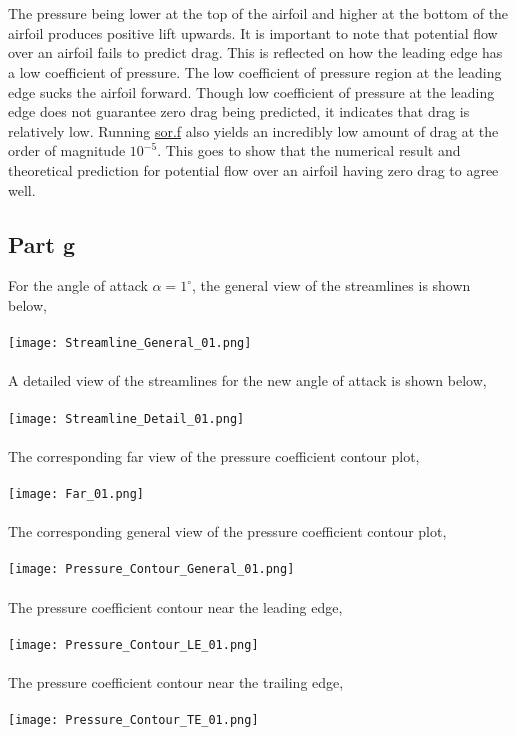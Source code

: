 \documentclass[a4paper, 12pt]{report}
\def\a{\alpha}
\def\sizel{1.03}
\begin{document}
\begin{center}
\\~\\The pressure being lower at the top of the airfoil and higher at the bottom of the airfoil produces positive lift upwards. It is important to note that potential flow over an airfoil fails to predict drag. This is reflected on how the leading edge has a low coefficient of pressure. The low coefficient of pressure region at the leading edge sucks the airfoil forward. Though low coefficient of pressure at the leading edge does not guarantee zero drag being predicted, it indicates that drag is relatively low. Running \url{sor.f} also yields an incredibly low amount of drag at the order of magnitude $10^{-5}$. This goes to show that the numerical result and theoretical prediction for potential flow over an airfoil having zero drag to agree well. 
\subsection{Part g}
For the angle of attack $\a=1^{\circ}$, the general view of the streamlines is shown below,
\\~\\\texttt{[image: Streamline\_General\_01.png]}
\\~\\A detailed view of the streamlines for the new angle of attack is shown below,
\\~\\\texttt{[image: Streamline\_Detail\_01.png]}
\\~\\The corresponding far view of the pressure coefficient contour plot,
\\~\\\texttt{[image: Far\_01.png]}
\\~\\The corresponding general view of the pressure coefficient contour plot,
\\~\\\texttt{[image: Pressure\_Contour\_General\_01.png]}
\\~\\The pressure coefficient contour near the leading edge,
\\~\\\texttt{[image: Pressure\_Contour\_LE\_01.png]}
\\~\\The pressure coefficient contour near the trailing edge,
\\~\\\texttt{[image: Pressure\_Contour\_TE\_01.png]}

\end{center}
\end{document}
